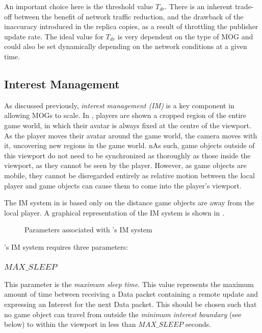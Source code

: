 An important choice here is the threshold value $T_{dr}$. There is an inherent trade-off between the benefit of network traffic reduction, and the drawback of the inaccuracy introduced in the replica copies, as a result of throttling the publisher update rate. The ideal value for $T_{dr}$ is very dependent on the type of MOG and could also be set dynamically depending on the network conditions at a given time.


\subsection{Interest Management}\label{sec:des:im}
As discussed previously, \textit{interest management (IM)} is a key component in allowing MOGs to scale. In \game{}, players are shown a cropped region of the entire game world, in which their avatar is always fixed at the centre of the viewport. As the player moves their avatar around the game world, the camera moves with it, uncovering new regions in the game world. nAs such, game objects outside of this viewport do not need to be synchronized as thoroughly as those inside the viewport, as they cannot be seen by the player. However, as game objects are mobile, they cannot be disregarded entirely as relative motion between the local player and game objects can cause them to come into the player's viewport. 

The IM system in \game{} is based only on the distance game objects are away from the local player. A graphical representation of the IM system is shown in .

\begin{figure}
    \centering
    \caption{Parameters associated with \game{}'s IM system}
    \label{fig:des:interest-regions}
\end{figure}

\game{}'s IM system requires three parameters:
\subsubsection{$MAX\_SLEEP$}
This parameter is the \textit{maximum sleep time}. This value represents the maximum amount of time between receiving a Data packet containing a remote update and expressing an Interest for the next Data packet. This should be chosen such that no game object can travel from outside the \textit{minimum interest boundary} (see below) to within the viewport in less than $MAX\_SLEEP$ seconds. 


